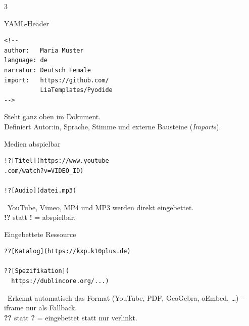 \documentclass[a4paper,landscape,9pt]{extarticle}
\newcommand{\prevsm}[1]{{\footnotesize\color{muted} #1}}
\begin{document}
\begin{multicols}{3}


\begin{liacard}{YAML-Header}
\begin{lstlisting}[language=lia]
<!--
author:   Maria Muster
language: de
narrator: Deutsch Female
import:   https://github.com/
          LiaTemplates/Pyodide
-->
\end{lstlisting}
\tcblower
\prevsm{Steht ganz oben im Dokument.\\
Definiert Autor:in, Sprache, Stimme
und externe Bausteine (\textit{Imports}).}
\end{liacard}


\begin{liacard}{Medien abspielbar}
\begin{lstlisting}[language=lia]
!?[Titel](https://www.youtube
.com/watch?v=VIDEO_ID)

!?[Audio](datei.mp3)
\end{lstlisting}
\tcblower
\prevsm{\faYoutube~YouTube, Vimeo, MP4
und MP3 werden direkt eingebettet.\\[2pt]
\textbf{!?} statt \textbf{!} = abspielbar.}
\end{liacard}

\begin{liacard}{Eingebettete Ressource}
\begin{lstlisting}[language=lia]
??[Katalog](https://kxp.k10plus.de)

??[Spezifikation](
  https://dublincore.org/...)
\end{lstlisting}
\tcblower
\prevsm{\faWindowMaximize~Erkennt automatisch
das Format (YouTube, PDF, GeoGebra,
oEmbed, \dots) -- iframe nur als
Fallback.\\[2pt]
\textbf{??} statt \textbf{?} = eingebettet
statt nur verlinkt.}
\end{liacard}


\end{multicols}
\end{document}
